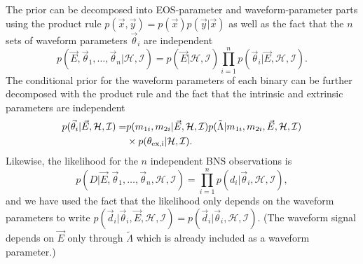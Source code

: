 \documentclass[twocolumn,prd,amssymb,aps,nofootinbib,showpacs,epsf]{revtex4}
\begin{document}
The prior can be decomposed into EOS-parameter and waveform-parameter parts using the product rule $p(\vec x, \vec y) = p(\vec x) p(\vec y | \vec x) $ as well as the fact that the $n$ sets of waveform parameters $\vec\theta_i$ are independent
\begin{equation}
p(\vec E,\vec\theta_1,\dots,\vec\theta_n | \mathcal{H},\mathcal{I}) = p(\vec E | \mathcal{H},\mathcal{I}) \prod_{i=1}^n p(\vec\theta_i | \vec E, \mathcal{H},\mathcal{I}).
\end{equation} 
The conditional prior for the waveform parameters of each binary can be further decomposed with the product rule and the fact that the intrinsic and extrinsic parameters are independent
\begin{equation}
\begin{split}
p(\vec\theta_i | \vec E, \mathcal{H},\mathcal{I}) =& p(m_{1i}, m_{2i} | \vec E, \mathcal{H},\mathcal{I}) p(\tilde\Lambda | m_{1i}, m_{2i}, \vec E, \mathcal{H},\mathcal{I})\\
&\times p(\theta_{\rm ex, i} | \mathcal{H}, \mathcal{I}).
\end{split}
\end{equation}
Likewise, the likelihood for the $n$ independent BNS observations is
\begin{equation}
p(D | \vec E,\vec\theta_1,\dots,\vec\theta_n, \mathcal{H},\mathcal{I}) = \prod_{i=1}^n p(d_i | \vec\theta_i, \mathcal{H},\mathcal{I}),
\end{equation}
and we have used the fact that the likelihood only depends on the waveform parameters to write $p(\vec d_i | \vec\theta_i, \vec E,\mathcal{H},\mathcal{I}) = p(\vec d_i | \vec\theta_i,\mathcal{H},\mathcal{I})$. (The waveform signal depends on $\vec E$ only through $\tilde\Lambda$ which is already included as a waveform parameter.)
\end{document}
